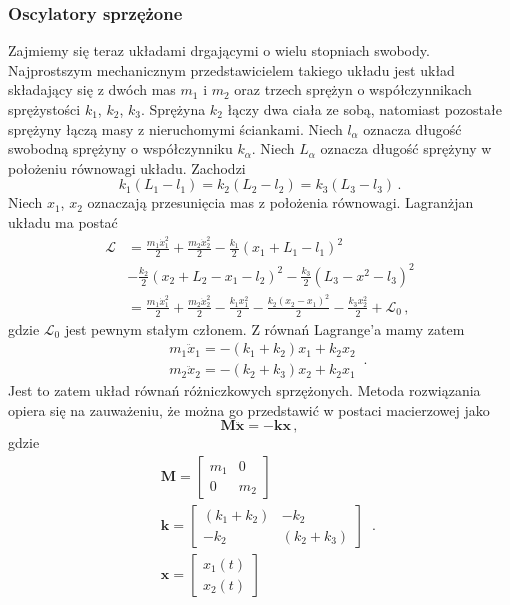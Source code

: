 \documentclass[../main.tex]{subfiles}
\begin{document}
    \subsubsection{Oscylatory sprzężone}
    Zajmiemy się teraz układami drgającymi o wielu stopniach swobody. Najprostszym mechanicznym przedstawicielem takiego układu jest układ składający się z dwóch mas \(m_1\) i \(m_2\) oraz trzech sprężyn o współczynnikach sprężystości \(k_1\), \(k_2\), \(k_3\). Sprężyna \(k_2\) łączy dwa ciała ze sobą, natomiast pozostałe sprężyny łączą masy z nieruchomymi ściankami. Niech \(l_\alpha\) oznacza długość swobodną sprężyny o współczynniku \(k_\alpha\). Niech \(L_\alpha\) oznacza długość sprężyny w położeniu równowagi układu. Zachodzi 
    \begin{equation*}
        k_1(L_1-l_1)=k_2(L_2-l_2)=k_3(L_3-l_3)\,.
    \end{equation*}
    Niech \(x_1\), \(x_2\) oznaczają przesunięcia mas z położenia równowagi. Lagranżjan układu ma postać
    \begin{equation*}
    \begin{split}
        \mathcal{L}&=\frac{m_1\dot{x}_1^2}{2}+\frac{m_2\dot{x}_2^2}{2}-\frac{k_1}{2}(x_1+L_1-l_1)^2\\
        &-\frac{k_2}{2}(x_2+L_2-x_1-l_2)^2-\frac{k_3}{2}(L_3-x^2-l_3)^2\\
        &=\frac{m_1\dot{x}_1^2}{2}+\frac{m_2\dot{x}_2^2}{2}-\frac{k_1x_1^2}{2}-\frac{k_2(x_2-x_1)^2}{2}-\frac{k_3x_2^2}{2}+\mathcal{L}_0\,,
    \end{split}
    \end{equation*}
    gdzie \(\mathcal{L}_0\) jest pewnym stałym członem. Z równań Lagrange'a mamy zatem
    \begin{equation*}
        \begin{split}
            &m_1\ddot x_1=-(k_1+k_2)x_1+k_2x_2\\
            &m_2\ddot x_2=-(k_2+k_3)x_2+k_2x_1
        \end{split}\,.
    \end{equation*}
    Jest to zatem układ równań różniczkowych sprzężonych. Metoda rozwiązania opiera się na zauważeniu, że można go przedstawić w postaci macierzowej jako
    \begin{equation*}
        \mathbf{M}\ddot{\mathbf{x}}=-\mathbf{k}\mathbf{x}\,,
    \end{equation*}
    gdzie
    \begin{equation*}
    \begin{split}
        &\mathbf{M}=\begin{bmatrix}m_1&0\\0&m_2 \end{bmatrix}\\
        &\mathbf{k}=\begin{bmatrix}(k_1+k_2)&-k_2\\-k_2&(k_2+k_3) \end{bmatrix}\\
        &\mathbf{x}=\begin{bmatrix}x_1(t)\\x_2(t) \end{bmatrix}
    \end{split}\,.
    \end{equation*}
\end{document}
